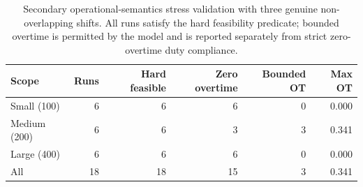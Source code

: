 \begin{table}[H]
\centering
\small
\setlength{\tabcolsep}{5pt}
\renewcommand{\arraystretch}{1.12}
\begin{tabular}{lrrrrr}
\toprule
\textbf{Scope} & \textbf{Runs} & \textbf{Hard feasible} & \textbf{Zero overtime} & \textbf{Bounded OT} & \textbf{Max OT} \\
\midrule
Small (100) & 6 & 6 & 6 & 0 & 0.000 \\
Medium (200) & 6 & 6 & 3 & 3 & 0.341 \\
Large (400) & 6 & 6 & 6 & 0 & 0.000 \\
All & 18 & 18 & 15 & 3 & 0.341 \\
\bottomrule
\end{tabular}
\caption{Secondary operational-semantics stress validation with three genuine non-overlapping shifts. All runs satisfy the hard feasibility predicate; bounded overtime is permitted by the model and is reported separately from strict zero-overtime duty compliance.}
\label{tab:operational_shift_stress}
\end{table}
